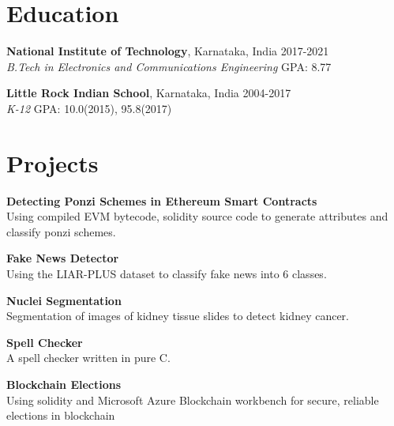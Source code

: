 \documentclass[margin]{res}
\begin{document}
  \address{National Institute of Technology\\Karnataka, India\\nitk.ac.in}
  \address{(91+) 9611212081\\russel.171ec143@nitk.edu.in\\github.com/rshwndsz}

  \begin{resume}
    \section{Education}
      \textbf{National Institute of Technology}, Karnataka, India\hfill 
      2017-2021
      \\
      {\sl B.Tech in Electronics and Communications Engineering}\hfill 
      GPA: 8.77
      

      \textbf{Little Rock Indian School}, Karnataka, India\hfill
      2004-2017
      \\
      {\sl K-12}\hfill
      GPA: 10.0(2015), 95.8(2017)

    \section{Projects}
      \par
      \textbf{Detecting Ponzi Schemes in Ethereum Smart Contracts}\\
      Using compiled EVM bytecode, solidity source code to generate attributes 
      and classify ponzi schemes.

      \par
      \textbf{Fake News Detector}\\
      Using the LIAR-PLUS dataset to classify fake news into 6 classes.

      \par
      \textbf{Nuclei Segmentation}\\
      Segmentation of images of kidney tissue slides to detect kidney cancer.

      \par
      \textbf{Spell Checker}\\
      A spell checker written in pure C.

      \par
      \textbf{Blockchain Elections}\\
      Using solidity and Microsoft Azure Blockchain workbench for secure, reliable elections in blockchain


\end{resume}
\end{document}

